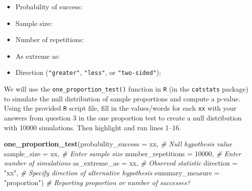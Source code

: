 \documentclass[
]{report}
\newenvironment{Shaded}{\begin{snugshade}}{\end{snugshade}}
\newcommand{\AttributeTok}[1]{\textcolor[rgb]{0.13,0.29,0.53}{#1}}
\newcommand{\CommentTok}[1]{\textcolor[rgb]{0.56,0.35,0.01}{\textit{#1}}}
\newcommand{\DecValTok}[1]{\textcolor[rgb]{0.00,0.00,0.81}{#1}}
\newcommand{\FunctionTok}[1]{\textcolor[rgb]{0.13,0.29,0.53}{\textbf{#1}}}
\newcommand{\NormalTok}[1]{#1}
\newcommand{\StringTok}[1]{\textcolor[rgb]{0.31,0.60,0.02}{#1}}
\providecommand{\tightlist}{%
  \setlength{\itemsep}{0pt}\setlength{\parskip}{0pt}}
\begin{document}
\begin{itemize}
\tightlist
\item
  Probability of success:
\end{itemize}

\vspace{.2in}

\begin{itemize}
\tightlist
\item
  Sample size:
\end{itemize}

\vspace{.2in}

\begin{itemize}
\tightlist
\item
  Number of repetitions:
\end{itemize}

\vspace{.2in}

\begin{itemize}
\tightlist
\item
  As extreme as:
\end{itemize}

\vspace{.2in}

\begin{itemize}
\tightlist
\item
  Direction (\texttt{"greater"}, \texttt{"less"}, or \texttt{"two-sided"}):
\end{itemize}

We will use the \texttt{one\_proportion\_test()} function in \texttt{R} (in the \texttt{catstats} package) to simulate the null distribution of sample proportions and compute a p-value. Using the provided \texttt{R} script file, fill in the values/words for each \texttt{xx} with your answers from question 3 in the one proportion test to create a null distribution with 10000 simulations. Then highlight and run lines 1--16.

\begin{Shaded}
\begin{Highlighting}[]
\FunctionTok{one\_proportion\_test}\NormalTok{(}\AttributeTok{probability\_success =}\NormalTok{ xx, }\CommentTok{\# Null hypothesis value}
          \AttributeTok{sample\_size =}\NormalTok{ xx, }\CommentTok{\# Enter sample size}
          \AttributeTok{number\_repetitions =} \DecValTok{10000}\NormalTok{, }\CommentTok{\# Enter number of simulations}
          \AttributeTok{as\_extreme\_as =}\NormalTok{ xx, }\CommentTok{\# Observed statistic}
          \AttributeTok{direction =} \StringTok{"xx"}\NormalTok{, }\CommentTok{\# Specify direction of alternative hypothesis}
          \AttributeTok{summary\_measure =} \StringTok{"proportion"}\NormalTok{) }\CommentTok{\# Reporting proportion or number of successes?}
\end{Highlighting}
\end{Shaded}
\end{document}
